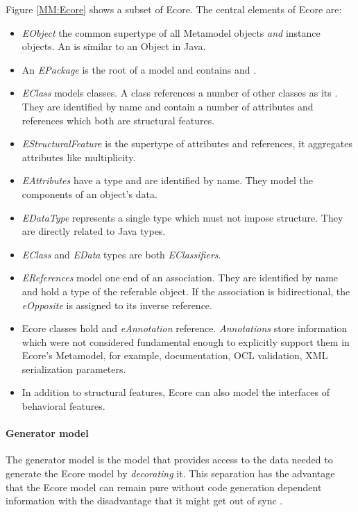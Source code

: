 Figure \ref{MM:Ecore} shows a subset of Ecore. The central elements of Ecore are:\\
\begin{itemize}
	\item \emph{EObject} the common supertype of all Metamodel objects \emph{and} instance objects. An  is similar to an Object in Java.
	\item An \emph{EPackage} is the root of a model and contains  and .
	\item \emph{EClass} models classes. A class references a number of other classes as its . They are identified by name and contain a number of attributes and references which both are structural features.
	\item \emph{EStructuralFeature} is the supertype of attributes and references, it aggregates attributes like multiplicity.
	\item \emph{EAttributes} have a type and are identified by name. They model the components of an object's data.
	\item \emph{EDataType} represents a single type which must not impose structure. They are directly related to Java types.
	\item \emph{EClass} and \emph{EData} types are both \emph{EClassifiers}.
	\item \emph{EReferences} model one end of an association. They are identified by name and hold a type of the referable object. If the association is bidirectional, the \emph{eOpposite} is assigned to its inverse reference. \cite{EMF2nd}
	\item Ecore classes hold and \emph{eAnnotation} reference. \emph{Annotations} store information which were not considered fundamental enough to explicitly support them in Ecore's Metamodel, for example, documentation, OCL validation, XML serialization parameters. \cite{EMP}
	\item In addition to structural features, Ecore can also model the interfaces of behavioral features.
\end{itemize}

\paragraph{Generator model}
The generator model is the model that provides access to the data needed to generate the Ecore model by \emph{decorating} it. This separation has the advantage that the Ecore model can remain pure without code generation dependent information with the disadvantage that it might get out of sync \cite{EMF2nd}.


